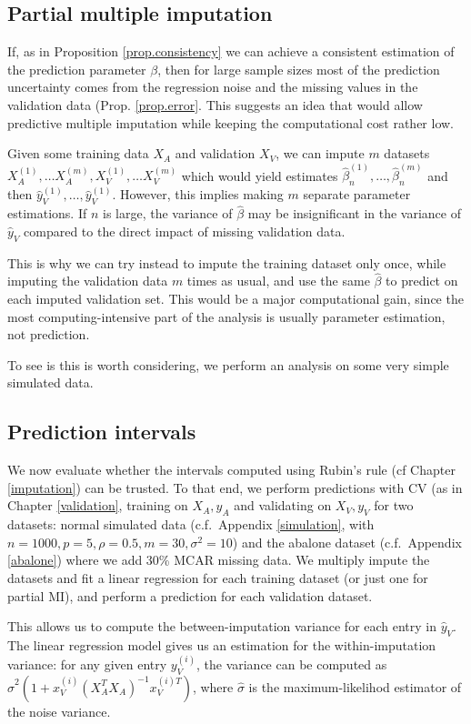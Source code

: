 		\subsection{Partial multiple imputation}
		If, as in Proposition \ref{prop.consistency} we can achieve a consistent estimation of the prediction parameter $\beta$, then for large sample sizes most of the prediction uncertainty comes from the regression noise and the missing values in the validation data (Prop. \ref{prop.error}. This suggests an idea that would allow predictive multiple imputation while keeping the computational cost rather low.
		
		 Given some training data $X_A$ and validation $X_V$, we can impute $m$ datasets $X_A^{(1)}, \ldots X_A^{(m)}, X_V^{(1)}, \ldots X_V^{(m)}$ which would yield estimates $\hat{\beta}_n^{(1)}, \ldots, \hat{\beta}_n^{(m)}$ and then $\hat{y}_V^{(1)}, \ldots, \hat{y}_V^{(1)}$. However, this implies making $m$ separate parameter estimations. If $n$ is large, the variance of $\hat{\beta}$ may be insignificant in the variance of $\hat{y}_V$ compared to the direct impact of missing validation data. 
		 
		 This is why we can try instead to impute the training dataset only once, while imputing the validation data $m$ times as usual, and use the same $\hat{\beta}$ to predict on each imputed validation set. This would be a major computational gain, since the most computing-intensive part of the analysis is usually parameter estimation, not prediction.

To see is this is worth considering, we perform an analysis on some very simple simulated data.

		\subsection{Prediction intervals}
We now evaluate whether the intervals computed using Rubin's rule (cf Chapter \ref{imputation}) can be trusted. To that end, we perform predictions with CV (as in Chapter \ref{validation}, training on $X_A, y_A$ and validating on $X_V, y_V$ for two datasets: normal simulated data (c.f.\ Appendix \ref{simulation}, with $n=1000, p=5, \rho=0.5, m=30, \sigma^2=10$) and the abalone dataset (c.f.\ Appendix \ref{abalone}) where we add 30\% MCAR missing data. We multiply impute the datasets and fit a linear regression for each training dataset (or just one for partial MI), and perform a prediction for each validation dataset.

This allows us to compute the between-imputation variance for each entry in $\hat{y}_V$. The linear regression model gives us an estimation for the within-imputation variance: for any given entry $y_V^{(i)}$, the variance can be computed as $\hat{\sigma}^2(1+x_V^{(i)} (X_A^T X_A)^{-1} x_V^{(i)T})$, where $\hat{\sigma}$ is the maximum-likelihod estimator of the noise variance.

